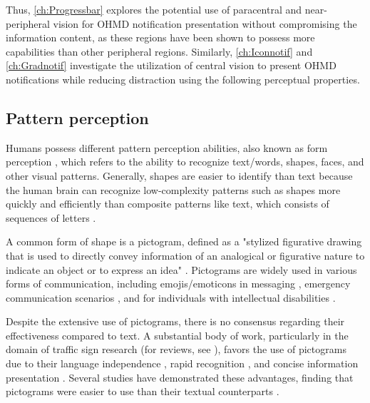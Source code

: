 Thus, \autoref{ch:Progressbar} explores the potential use of paracentral and near-peripheral vision for OHMD notification presentation without compromising the information content, as these regions have been shown to possess more capabilities than other peripheral regions.
Similarly, \autoref{ch:Iconnotif} and \autoref{ch:Gradnotif} investigate the utilization of central vision to present OHMD notifications while reducing distraction using the following perceptual properties.

\subsection{Pattern perception}
\label{sec:Relatedwork:pattern_perception}

 
Humans possess different pattern perception abilities, also known as form perception \cite{alvarado_sensation_2011}, which refers to the ability to recognize text/words, shapes, faces, and other visual patterns. Generally, shapes are easier to identify than text because the human brain can recognize low-complexity patterns such as shapes more quickly and efficiently than composite patterns like text, which consists of sequences of letters \cite[Ch~6]{wickens_engineering_2015}.

A common form of shape is a pictogram, defined as a "stylized figurative drawing that is used to directly convey information of an analogical or figurative nature to indicate an object or to express an idea" \cite{tijus_design_2007}. Pictograms are widely used in various forms of communication, including emojis/emoticons in messaging \cite{zhou_goodbye_2017, tauch_the_2016}, emergency communication scenarios \cite{wolk_pictogram_2017, fitrianie_communication_2005}, and for individuals with intellectual disabilities \cite{sevens_words_2018}.

Despite the extensive use of pictograms, there is no consensus regarding their effectiveness compared to text. A substantial body of work, particularly in the domain of traffic sign research (for reviews, see \cite{bartlomiejczyk_text_2013, castro_effectiveness_2004}), favors the use of pictograms due to their language independence \cite{tijus_design_2007}, rapid recognition \cite{ells_rapid_1979, kline_visibility_1990}, and concise information presentation \cite{camacho_icons_1990, mcdougall_measuring_1999}. Several studies have demonstrated these advantages, finding that pictograms were easier to use than their textual counterparts \cite{tijus_design_2007, caplin_2001_icon}.

